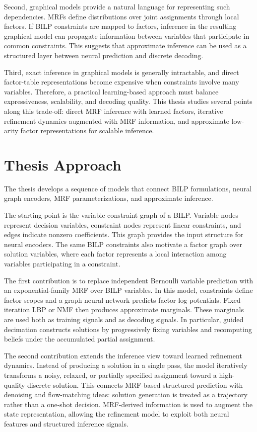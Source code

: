 Second, graphical models provide a natural language for representing such dependencies. MRFs define distributions over joint assignments through local factors. If BILP constraints are mapped to factors, inference in the resulting graphical model can propagate information between variables that participate in common constraints. This suggests that approximate inference can be used as a structured layer between neural prediction and discrete decoding.

Third, exact inference in graphical models is generally intractable, and direct factor-table representations become expensive when constraints involve many variables. Therefore, a practical learning-based approach must balance expressiveness, scalability, and decoding quality. This thesis studies several points along this trade-off: direct MRF inference with learned factors, iterative refinement dynamics augmented with MRF information, and approximate low-arity factor representations for scalable inference.

\section{Thesis Approach}

The thesis develops a sequence of models that connect BILP formulations, neural graph encoders, MRF parameterizations, and approximate inference.

The starting point is the variable-constraint graph of a BILP. Variable nodes represent decision variables, constraint nodes represent linear constraints, and edges indicate nonzero coefficients. This graph provides the input structure for neural encoders. The same BILP constraints also motivate a factor graph over solution variables, where each factor represents a local interaction among variables participating in a constraint.

The first contribution is to replace independent Bernoulli variable prediction with an exponential-family MRF over BILP variables. In this model, constraints define factor scopes and a graph neural network predicts factor log-potentials. Fixed-iteration LBP or NMF then produces approximate marginals. These marginals are used both as training signals and as decoding signals. In particular, guided decimation constructs solutions by progressively fixing variables and recomputing beliefs under the accumulated partial assignment.

The second contribution extends the inference view toward learned refinement dynamics. Instead of producing a solution in a single pass, the model iteratively transforms a noisy, relaxed, or partially specified assignment toward a high-quality discrete solution. This connects MRF-based structured prediction with denoising and flow-matching ideas: solution generation is treated as a trajectory rather than a one-shot decision. MRF-derived information is used to augment the state representation, allowing the refinement model to exploit both neural features and structured inference signals.

